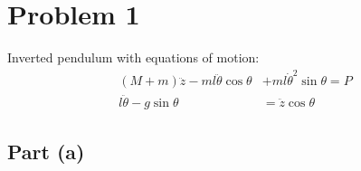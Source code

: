 \documentclass[11pt]{article}
\begin{document}
\thispagestyle{empty}

\newlength{\boxlength}\setlength{\boxlength}{\textwidth}
\addtolength{\boxlength}{-4mm}

\begin{center}
\end{center}

\section*{Problem 1}
Inverted pendulum with equations of motion:
\begin{align*}
	(M+m)\ddot{z}-ml\ddot{\theta}\cos\theta&+ml\dot{\theta}^2\sin\theta=P \\
	l\ddot{\theta}-g\sin\theta &= \ddot{z}\cos\theta
\end{align*}
\subsection*{Part (a)}
\end{document}
